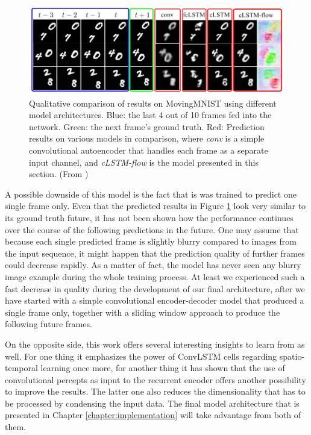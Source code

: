 \begin{figure}[htb]
	\centering
	\includegraphics[width=1.0\linewidth]{figures/related/spat_temp_results.png} 
	\caption[Qualitative MovingMNIST Results of LSTM Models]{Qualitative comparison of results on MovingMNIST using different model architectures. Blue: the last 4 out of 10 frames fed into the network. Green: the next frame's ground truth. Red: Prediction results on various models in comparison, where \textit{conv} is a simple convolutional autoencoder that handles each frame as a separate input channel, and \textit{cLSTM-flow} is the model presented in this section. (From \parencite{spat_temp_video_autoenc})} \label{fig:spatiotemp_results}
\end{figure}

A possible downside of this model is the fact that is was trained to predict one single frame only. Even that the predicted results in Figure \ref{fig:spatiotemp_results} look very similar to its ground truth future, it has not been shown how the performance continues over the course of the following predictions in the future. One may assume that because each single predicted frame is slightly blurry compared to images from the input sequence, it might happen that the prediction quality of further frames could decrease rapidly. As a matter of fact, the model has never seen any blurry image example during the whole training process. At least we experienced such a fast decrease in quality during the development of our final architecture, after we have started with a simple convolutional encoder-decoder model that produced a single frame only, together with a sliding window approach to produce the following future frames.

On the opposite side, this work offers several interesting insights to learn from as well. For one thing it emphasizes the power of ConvLSTM cells regarding spatio-temporal learning once more, for another thing it has shown that the use of convolutional percepts as input to the recurrent encoder offers another possibility to improve the results. The latter one also reduces the dimensionality that has to be processed by condensing the input data. The final model architecture that is presented in Chapter \ref{chapter:implementation} will take advantage from both of them.


